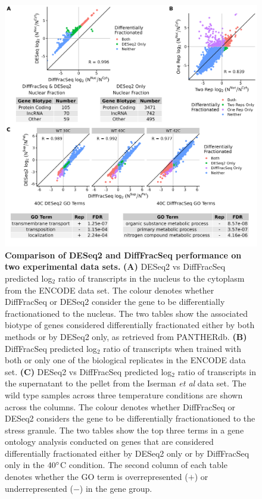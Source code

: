 \documentclass[../main.tex]{subfiles}
\begin{document}
\begin{figure}

{\centering \includegraphics[width=1\linewidth]{figures/DESeq_vs_bayesian_encode_and_iserman_combined.png} 

}

\caption[DiffFracSeq vs DESeq2 performance on the experimental data sets.]{\textbf{Comparison of DESeq2 and DiffFracSeq performance on two experimental data sets.} \textbf{(A)} DESeq2 vs DiffFracSeq predicted log$_2$ ratio of transcripts in the nucleus to the cytoplasm from the ENCODE data set. The colour denotes whether DiffFracSeq or DESeq2 consider the gene to be differentially fractionationed to the nucleus. The two tables show the associated biotype of genes considered differentially fractionated either by both methods or by DESeq2 only, as retrieved from PANTHERdb. \textbf{(B)} DiffFracSeq predicted log$_2$ ratio of transcripts when trained with both or only one of the biological replicates in the ENCODE data set. \textbf{(C)} DESeq2 vs DiffFracSeq predicted log$_2$ ratio of transcripts in the supernatant to the pellet from the Iserman \textit{et al} data set. The wild type samples across three temperature conditions are shown across the columns. The colour denotes whether DiffFracSeq or DESeq2 considers the gene to be differentially fractionationed to the stress granule. The two tables show the top three terms in a gene ontology analysis conducted on genes that are considered differentially fractionated either by DESeq2 only or by DiffFracSeq only in the $40\degree$C condition. The second column of each table denotes whether the GO term is overrepresented ($+$) or underrepresented ($-$) in the gene group.} \label{fig:encode-iserman-data-results}
\end{figure}
\newpage
\end{document}

